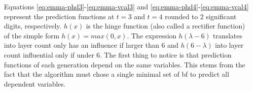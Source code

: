 Equations \ref{eq:emma-phd3}-\ref{eq:emma-vcal3} and \ref{eq:emma-phd4}-\ref{eq:emma-vcal4} represent the prediction functions at $t=3$ and $t=4$ rounded to 2 significant digits, respectively.
$h(x)$ is the hinge function (also called a rectifier function) of the simple form $h(x) = max(0,x)$. 
The expression $h(\lambda-6)$ translates into layer count only has an influence if larger than 6 
and $h(6-\lambda)$ into layer count influential only if under 6.
%
The first thing to notice is that prediction functions of each generation depend on the same variables. 
This stems from the fact that the algorithm must chose a single minimal set of \gls{bf} to predict all dependent variables. 
%

